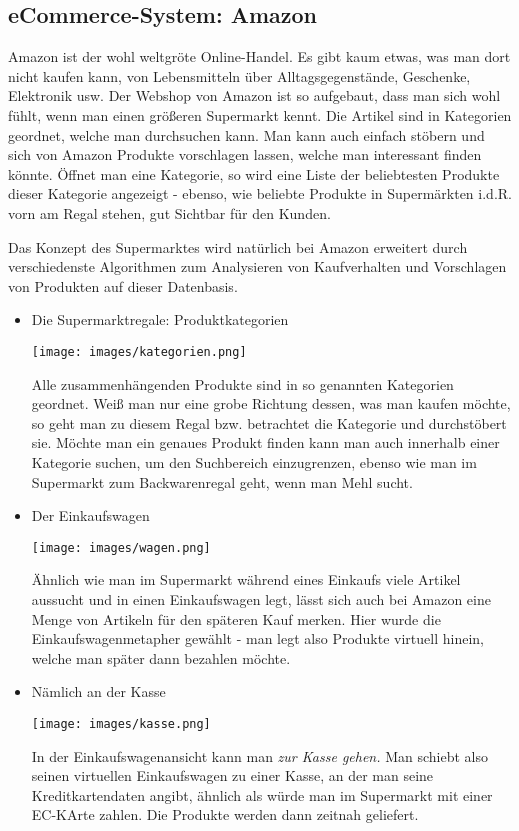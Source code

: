 \documentclass[a4paper,10pt]{article}
\begin{document}
\kopf
\renewcommand{\figurename}{Figure}


\subsection{eCommerce-System: Amazon}
Amazon ist der wohl weltgröte Online-Handel. Es gibt kaum etwas, was man dort nicht kaufen kann, von Lebensmitteln über Alltagsgegenstände, Geschenke, Elektronik usw. Der Webshop von Amazon ist so aufgebaut, dass man sich wohl fühlt, wenn man einen größeren Supermarkt kennt. Die Artikel sind in Kategorien geordnet, welche man durchsuchen kann. Man kann auch einfach stöbern und sich von Amazon Produkte vorschlagen lassen, welche man interessant finden könnte. 
Öffnet man eine Kategorie, so wird eine Liste der beliebtesten Produkte dieser Kategorie angezeigt - ebenso, wie beliebte Produkte in Supermärkten i.d.R. vorn am Regal stehen, gut Sichtbar für den Kunden.

Das Konzept des Supermarktes wird natürlich bei Amazon erweitert durch verschiedenste Algorithmen zum Analysieren von Kaufverhalten und Vorschlagen von Produkten auf dieser Datenbasis.

\begin{itemize}
\item Die Supermarktregale: Produktkategorien

\texttt{[image: images/kategorien.png]}

Alle zusammenhängenden Produkte sind in so genannten Kategorien geordnet. Weiß man nur eine grobe Richtung dessen, was man kaufen möchte, so geht man zu diesem Regal bzw. betrachtet die Kategorie und durchstöbert sie. Möchte man ein genaues Produkt finden kann man auch innerhalb einer Kategorie suchen, um den Suchbereich einzugrenzen, ebenso wie man im Supermarkt zum Backwarenregal geht, wenn man Mehl sucht.

\item Der Einkaufswagen

\texttt{[image: images/wagen.png]}

Ähnlich wie man im Supermarkt während eines Einkaufs viele Artikel aussucht und in einen Einkaufswagen legt, lässt sich auch bei Amazon eine Menge von Artikeln für den späteren Kauf merken. Hier wurde die Einkaufswagenmetapher gewählt - man legt also Produkte virtuell hinein, welche man später dann bezahlen möchte.

\item Nämlich an der Kasse

\texttt{[image: images/kasse.png]}

In der Einkaufswagenansicht kann man \textit{zur Kasse gehen.} Man schiebt also seinen virtuellen Einkaufswagen zu einer Kasse, an der man seine Kreditkartendaten angibt, ähnlich als würde man im Supermarkt mit einer EC-KArte zahlen. Die Produkte werden dann zeitnah geliefert.
\end{itemize}
\end{document}
